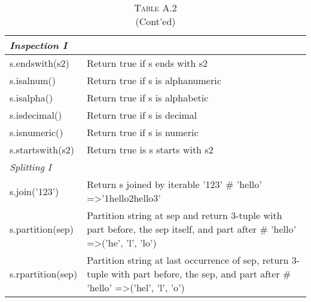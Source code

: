 \documentclass[a4paper,11pt]{book}
\numberwithin{figure}{chapter}
\numberwithin{table}{chapter}
\begin{document}
\begin{appendices}
\begin{table}[!htbp]
\centering
\caption*{\textsc{Table A.2} \\ (Cont'ed)}
\label{tab:string_methods_cted}
\begin{tabular}{lp{12cm}}
\\ \midrule
\textit{Inspection I}             &                                                                                                                                                 \\ \midrule
s.endswith(s2)           & Return true if s ends with s2                                                                                                                   \\
s.isalnum()              & Return true if s is alphanumeric                                                                                                                \\
s.isalpha()              & Return true if s is alphabetic                                                                                                                  \\
s.isdecimal()            & Return true if s is decimal                                                                                                                     \\
s.isnumeric()            & Return true if s is numeric                                                                                                                     \\
s.startswith(s2)         & Return true is s starts with s2                                                                                                                 \\          
\midrule
\textit{Splitting I}              &                                                                                                                                                 \\ \midrule
s.join('123')            & Return s joined by iterable '123' \# 'hello' =\textgreater '1hello2hello3'                                                                      \\
s.partition(sep)         & Partition string at sep and return 3-tuple with part before, the sep itself, and part after \# 'hello' =\textgreater ('he', 'l', 'lo')          \\
s.rpartition(sep)        & Partition string at last occurrence of sep, return 3-tuple with part before, the sep, and part after \# 'hello' =\textgreater ('hel', 'l', 'o') \\

\end{tabular}
\end{table}
\end{appendices}
\end{document}
